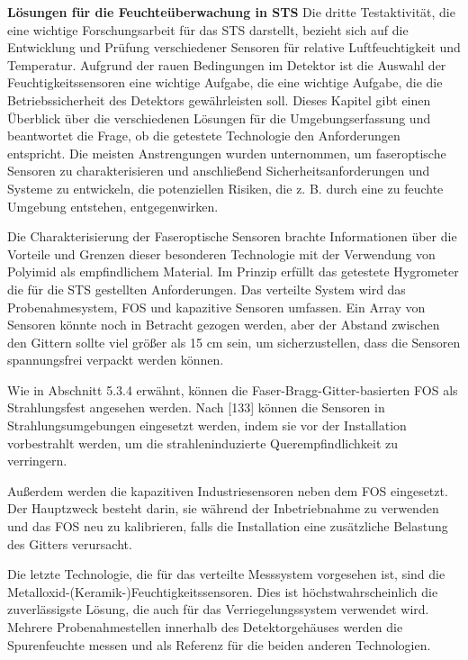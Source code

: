 \bigbreak
\textbf{Lösungen für die Feuchteüberwachung in \gls{STS}}
\bigbreak
Die dritte Testaktivität, die eine wichtige Forschungsarbeit für das \gls{STS} darstellt, bezieht sich auf die Entwicklung und Prüfung verschiedener Sensoren für relative Luftfeuchtigkeit und Temperatur. Aufgrund der rauen Bedingungen im Detektor ist die Auswahl der Feuchtigkeitssensoren eine wichtige Aufgabe, die eine wichtige Aufgabe, die die Betriebssicherheit des Detektors gewährleisten soll. Dieses Kapitel gibt einen Überblick über die verschiedenen Lösungen für die Umgebungserfassung und beantwortet die Frage, ob die getestete Technologie den Anforderungen entspricht. Die meisten Anstrengungen wurden unternommen, um faseroptische Sensoren zu charakterisieren und anschließend Sicherheitsanforderungen und Systeme zu entwickeln, die potenziellen Risiken, die z. B. durch eine zu feuchte Umgebung entstehen, entgegenwirken.

Die Charakterisierung der Faseroptische Sensoren brachte Informationen über die Vorteile und Grenzen dieser besonderen Technologie mit der Verwendung von Polyimid als empfindlichem Material. Im Prinzip erfüllt das getestete Hygrometer die für die \gls{STS} gestellten Anforderungen. Das verteilte System wird das Probenahmesystem, FOS und kapazitive Sensoren umfassen. Ein Array von Sensoren könnte noch in Betracht gezogen werden, aber der Abstand zwischen den Gittern sollte viel größer als 15 cm sein, um sicherzustellen, dass die Sensoren spannungsfrei verpackt werden können. 

Wie in Abschnitt 5.3.4 erwähnt, können die Faser-Bragg-Gitter-basierten \gls{FOS} als Strahlungsfest angesehen werden. Nach [133] können die Sensoren in Strahlungsumgebungen eingesetzt werden, indem sie vor der Installation vorbestrahlt werden, um die strahleninduzierte Querempfindlichkeit zu verringern.

Außerdem werden die kapazitiven Industriesensoren neben dem FOS eingesetzt. Der Hauptzweck besteht darin, sie während der Inbetriebnahme zu verwenden und das FOS neu zu kalibrieren, falls die Installation eine zusätzliche Belastung des Gitters verursacht.

Die letzte Technologie, die für das verteilte Messsystem vorgesehen ist, sind die Metalloxid-(Keramik-)Feuchtigkeitssensoren. Dies ist höchstwahrscheinlich die zuverlässigste Lösung, die auch für das Verriegelungssystem verwendet wird. Mehrere Probenahmestellen innerhalb des Detektorgehäuses werden die Spurenfeuchte messen und als Referenz für die beiden anderen Technologien.

